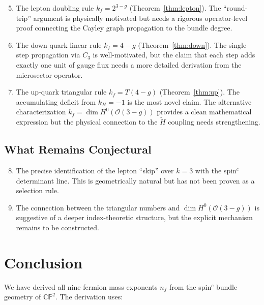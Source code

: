 \documentclass[11pt,a4paper]{article}
\newcommand{\CP}{\mathbb{CP}}
\theoremstyle{definition}
\theoremstyle{remark}
\begin{document}
\begin{enumerate}
\setcounter{enumi}{4}
\item The lepton doubling rule $k_f = 2^{3-g}$ (Theorem~\ref{thm:lepton}).
  The ``round-trip'' argument is physically motivated but needs a
  rigorous operator-level proof connecting the Cayley graph propagation
  to the bundle degree.

\item The down-quark linear rule $k_f = 4-g$ (Theorem~\ref{thm:down}).
  The single-step propagation via $C_3$ is well-motivated, but the claim
  that each step adds exactly one unit of gauge flux needs a more
  detailed derivation from the microsector operator.

\item The up-quark triangular rule $k_f = T(4-g)$ (Theorem~\ref{thm:up}).
  The accumulating deficit from $k_H = -1$ is the most novel claim.
  The alternative characterization $k_f = \dim H^0(\mathcal{O}(3-g))$
  provides a clean mathematical expression but the physical connection
  to the $\tilde{H}$ coupling needs strengthening.
\end{enumerate}

\subsection{What Remains Conjectural}

\begin{enumerate}
\setcounter{enumi}{7}
\item The precise identification of the lepton ``skip'' over $k = 3$
  with the spin$^c$ determinant line.  This is geometrically natural
  but has not been proven as a selection rule.

\item The connection between the triangular numbers and $\dim H^0(\mathcal{O}(3-g))$
  is suggestive of a deeper index-theoretic structure, but the
  explicit mechanism remains to be constructed.
\end{enumerate}

\section{Conclusion}
\label{sec:conclusion}

We have derived all nine fermion mass exponents $n_f$ from the spin$^c$
bundle geometry of $\CP^2$.  The derivation uses:
\end{document}
